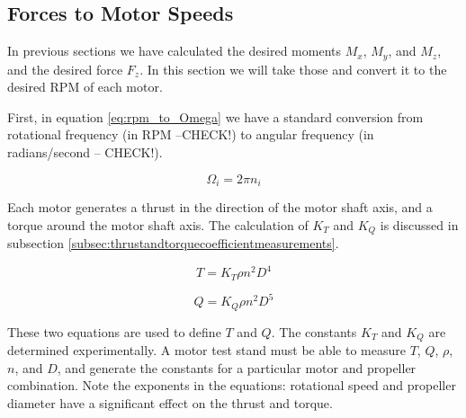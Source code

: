 \documentclass{article}
\numberwithin{equation}{section} %
\begin{document}
\subsection{Forces to Motor Speeds} \label{subsec:forcestomotorspeeds}
In previous sections we have calculated the desired moments $M_x$, $M_y$, and $M_z$, and the desired force $F_z$. In this section we will take those and convert it to the desired RPM of each motor.

First, in equation \eqref{eq:rpm_to_Omega} we have a standard conversion from rotational frequency (in RPM --CHECK!) to angular frequency (in radians/second -- CHECK!).
 
\begin{equation} \label{eq:rpm_to_Omega}
\Omega_i = 2 \pi n_i
\end{equation}

Each motor generates a thrust in the direction of the motor shaft axis, and a torque around the motor shaft axis. The calculation of $K_T$ and $K_Q$ is discussed in subsection \ref{subsec:thrustandtorquecoefficientmeasurements}.


\begin{equation} \label{eq:motor_thrust}
T = K_T\rho n^2 D^4
\end{equation}

\begin{equation} \label{eq:motor_torque}
Q = K_Q\rho n^2 D^5
\end{equation}

%

These two equations are used to define $T$ and $Q$. The constants $K_T$ and $K_Q$ are determined experimentally. A motor test stand must be able to measure $T$, $Q$, $\rho$, $n$, and $D$, and generate the constants for a particular motor and propeller combination. Note the exponents in the equations: rotational speed and propeller diameter have a significant effect on the thrust and torque.
\end{document}
